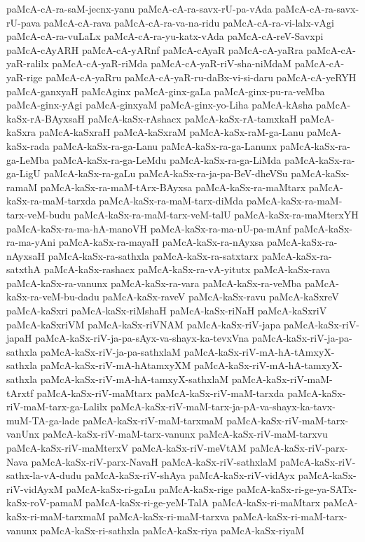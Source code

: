 {paMcA-cA-ra-saM-jecnx-yanu
paMcA-cA-ra-savx-rU-pa-vAda
paMcA-cA-ra-savx-rU-pava
paMcA-cA-rava
paMcA-cA-ra-va-na-ridu
paMcA-cA-ra-vi-lalx-vAgi
paMcA-cA-ra-vuLaLx
paMcA-cA-ra-yu-katx-vAda
paMcA-cA-reV-Savxpi
paMcA-cAyARH
paMcA-cA-yARnf
paMcA-cAyaR
paMcA-cA-yaRra
paMcA-cA-yaR-ralilx
paMcA-cA-yaR-riMda
paMcA-cA-yaR-riV-sha-niMdaM
paMcA-cA-yaR-rige
paMcA-cA-yaRru
paMcA-cA-yaR-ru-daBx-vi-si-daru
paMcA-cA-yeRYH
paMcA-ganxyaH
paMcAginx
paMcA-ginx-gaLa
paMcA-ginx-pu-ra-veMba
paMcA-ginx-yAgi
paMcA-ginxyaM
paMcA-ginx-yo-Liha
paMcA-kAsha
paMcA-kaSx-rA-BAyxsaH
paMcA-kaSx-rAshacx
paMcA-kaSx-rA-tamxkaH
paMcA-kaSxra
paMcA-kaSxraH
paMcA-kaSxraM
paMcA-kaSx-raM-ga-Lanu
paMcA-kaSx-rada
paMcA-kaSx-ra-ga-Lanu
paMcA-kaSx-ra-ga-Lanunx
paMcA-kaSx-ra-ga-LeMba
paMcA-kaSx-ra-ga-LeMdu
paMcA-kaSx-ra-ga-LiMda
paMcA-kaSx-ra-ga-LigU
paMcA-kaSx-ra-gaLu
paMcA-kaSx-ra-ja-pa-BeV-dheVSu
paMcA-kaSx-ramaM
paMcA-kaSx-ra-maM-tArx-BAyxsa
paMcA-kaSx-ra-maMtarx
paMcA-kaSx-ra-maM-tarxda
paMcA-kaSx-ra-maM-tarx-diMda
paMcA-kaSx-ra-maM-tarx-veM-budu
paMcA-kaSx-ra-maM-tarx-veM-talU
paMcA-kaSx-ra-maMterxYH
paMcA-kaSx-ra-ma-hA-manoVH
paMcA-kaSx-ra-ma-nU-pa-mAnf
paMcA-kaSx-ra-ma-yAni
paMcA-kaSx-ra-mayaH
paMcA-kaSx-ra-nAyxsa
paMcA-kaSx-ra-nAyxsaH
paMcA-kaSx-ra-sathxla
paMcA-kaSx-ra-satxtarx
paMcA-kaSx-ra-satxthA
paMcA-kaSx-rashacx
paMcA-kaSx-ra-vA-yitutx
paMcA-kaSx-rava
paMcA-kaSx-ra-vanunx
paMcA-kaSx-ra-vara
paMcA-kaSx-ra-veMba
paMcA-kaSx-ra-veM-bu-dadu
paMcA-kaSx-raveV
paMcA-kaSx-ravu
paMcA-kaSxreV
paMcA-kaSxri
paMcA-kaSx-riMshaH
paMcA-kaSx-riNaH
paMcA-kaSxriV
paMcA-kaSxriVM
paMcA-kaSx-riVNAM
paMcA-kaSx-riV-japa
paMcA-kaSx-riV-japaH
paMcA-kaSx-riV-ja-pa-sAyx-va-shayx-ka-tevxVna
paMcA-kaSx-riV-ja-pa-sathxla
paMcA-kaSx-riV-ja-pa-sathxlaM
paMcA-kaSx-riV-mA-hA-tAmxyX-sathxla
paMcA-kaSx-riV-mA-hAtamxyXM
paMcA-kaSx-riV-mA-hA-tamxyX-sathxla
paMcA-kaSx-riV-mA-hA-tamxyX-sathxlaM
paMcA-kaSx-riV-maM-tArxtf
paMcA-kaSx-riV-maMtarx
paMcA-kaSx-riV-maM-tarxda
paMcA-kaSx-riV-maM-tarx-ga-Lalilx
paMcA-kaSx-riV-maM-tarx-ja-pA-va-shayx-ka-tavx-muM-TA-ga-lade
paMcA-kaSx-riV-maM-tarxmaM
paMcA-kaSx-riV-maM-tarx-vanUnx
paMcA-kaSx-riV-maM-tarx-vanunx
paMcA-kaSx-riV-maM-tarxvu
paMcA-kaSx-riV-maMterxV
paMcA-kaSx-riV-meVtAM
paMcA-kaSx-riV-parx-Nava
paMcA-kaSx-riV-parx-NavaH
paMcA-kaSx-riV-sathxlaM
paMcA-kaSx-riV-sathx-la-vA-dudu
paMcA-kaSx-riV-shAya
paMcA-kaSx-riV-vidAyx
paMcA-kaSx-riV-vidAyxM
paMcA-kaSx-ri-gaLu
paMcA-kaSx-rige
paMcA-kaSx-ri-ge-ya-SATx-kaSx-roV-pamaM
paMcA-kaSx-ri-ge-yeM-TalA
paMcA-kaSx-ri-maMtarx
paMcA-kaSx-ri-maM-tarxmaM
paMcA-kaSx-ri-maM-tarxva
paMcA-kaSx-ri-maM-tarx-vanunx
paMcA-kaSx-ri-sathxla
paMcA-kaSx-riya
paMcA-kaSx-riyaM
}
